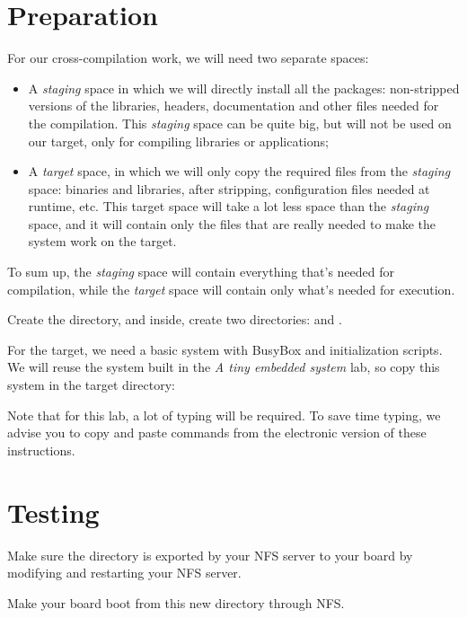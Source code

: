 \section{Preparation}

For our cross-compilation work, we will need two separate spaces:
\begin{itemize}
\item A \emph{staging} space in which we will directly install all the
  packages: non-stripped versions of the libraries, headers,
  documentation and other files needed for the compilation. This
  \emph{staging} space can be quite big, but will not be used on our
  target, only for compiling libraries or applications;
\item A \emph{target} space, in which we will only copy the required
  files from the \emph{staging} space: binaries and libraries, after
  stripping, configuration files needed at runtime, etc. This target
  space will take a lot less space than the \emph{staging} space, and
  it will contain only the files that are really needed to make the
  system work on the target.
\end{itemize}

To sum up, the {\em staging} space will contain everything that's
needed for compilation, while the {\em target} space will contain only
what's needed for execution.

Create the  directory,
and inside, create two directories:  and .

For the target, we need a basic system with BusyBox and
initialization scripts. We will reuse the system built in the {\em A
  tiny embedded system} lab, so copy this system in the target
directory:


Note that for this lab, a lot of typing will be required. To save time
typing, we advise you to copy and paste commands from the electronic
version of these instructions.

\section{Testing}

Make sure the  directory is exported by your NFS server
to your board by modifying  and restarting your NFS
server.

Make your board boot from this new directory through NFS.

